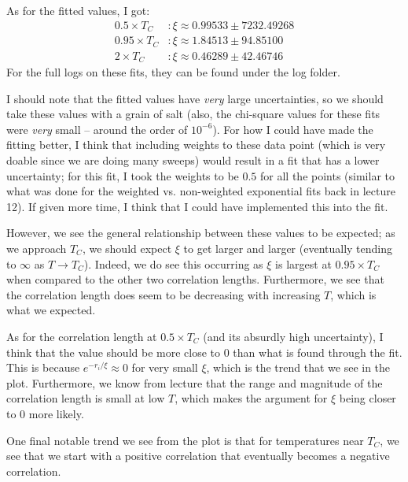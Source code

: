\begin{qBox}{4}
As for the fitted values, I got: 
\begin{equation*}
    \begin{aligned}
        0.5 \times T_{ C }&: \xi \approx 0.99533 \pm 7232.49268
        \\
        0.95 \times T_{ C }&: \xi \approx 1.84513 \pm 94.85100
        \\
        2 \times T_{ C }&: \xi \approx 0.46289 \pm 42.46746
    \end{aligned}
\end{equation*}
For the full logs on these fits, they can be found under the log folder.

\baseSkip 

I should note that the fitted values have \textit{very} large uncertainties, so 
we should take these values with a grain of salt (also, the chi-square values for 
these fits were \textit{very} small -- around the order of \( 10^{ -6 } \)).
For how I could have made the fitting better, I think that including weights to these
data point (which is very doable since we are doing many sweeps) would result in a 
fit that has a lower uncertainty; for this fit, I took the weights to be \( 0.5 \) 
for all the points (similar to what was done for the weighted vs. non-weighted 
exponential fits back in lecture 12).
If given more time, I think that I could have implemented this into the fit.

\baseSkip 

However, we see the general relationship between these values to be expected;
as we approach \( T_{ C } \), we should expect \( \xi \) to get larger and larger 
(eventually tending to \( \infty \) as \( T \rightarrow T_{ C } \)).
Indeed, we do see this occurring as \( \xi \) is largest at \( 0.95 \times T_{ C } \)
when compared to the other two correlation lengths. 
Furthermore, we see that the correlation length does seem to be decreasing with 
increasing \( T \), which is what we expected. 

\baseSkip 

As for the correlation length at \( 0.5 \times T_{ C } \) (and its absurdly high 
uncertainty), I think that the value should be more close to \( 0 \) than what is 
found through the fit. 
This is because \( e^{ - r_{ i } / \xi } \approx 0 \) for very small \( \xi \),
which is the trend that we see in the plot. 
Furthermore, we know from lecture that the range and magnitude of the correlation 
length is small at low \( T \), which makes the argument for \( \xi \) being closer to 
\( 0 \) more likely. 

\baseSkip

One final notable trend we see from the plot is that for temperatures near 
\( T_{ C } \), we see that we start with a positive correlation that eventually 
becomes a negative correlation. 
\end{qBox}